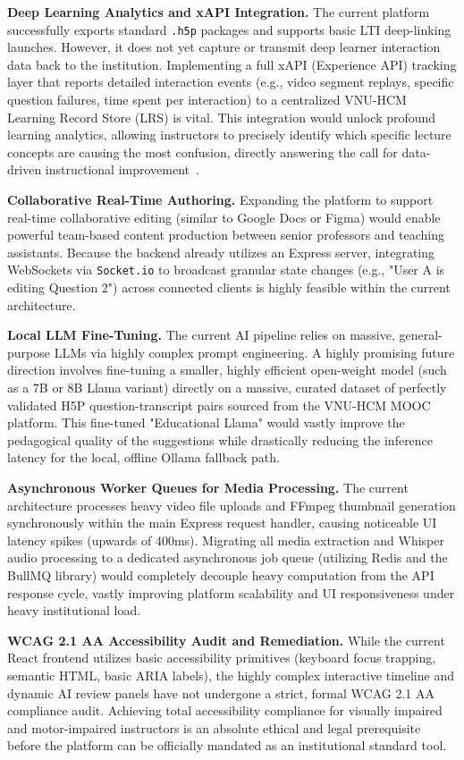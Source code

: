 \textbf{Deep Learning Analytics and xAPI Integration.} The current platform successfully exports standard \texttt{.h5p} packages and supports basic LTI deep-linking launches. However, it does not yet capture or transmit deep learner interaction data back to the institution. Implementing a full xAPI (Experience API) tracking layer that reports detailed interaction events (e.g., video segment replays, specific question failures, time spent per interaction) to a centralized VNU-HCM Learning Record Store (LRS) is vital. This integration would unlock profound learning analytics, allowing instructors to precisely identify which specific lecture concepts are causing the most confusion, directly answering the call for data-driven instructional improvement~\cite{siemens2011}.

\textbf{Collaborative Real-Time Authoring.} Expanding the platform to support real-time collaborative editing (similar to Google Docs or Figma) would enable powerful team-based content production between senior professors and teaching assistants. Because the backend already utilizes an Express server, integrating WebSockets via \texttt{Socket.io} to broadcast granular state changes (e.g., "User A is editing Question 2") across connected clients is highly feasible within the current architecture.

\textbf{Local LLM Fine-Tuning.} The current AI pipeline relies on massive, general-purpose LLMs via highly complex prompt engineering. A highly promising future direction involves fine-tuning a smaller, highly efficient open-weight model (such as a 7B or 8B Llama variant) directly on a massive, curated dataset of perfectly validated H5P question-transcript pairs sourced from the VNU-HCM MOOC platform. This fine-tuned "Educational Llama" would vastly improve the pedagogical quality of the suggestions while drastically reducing the inference latency for the local, offline Ollama fallback path.

\textbf{Asynchronous Worker Queues for Media Processing.} The current architecture processes heavy video file uploads and FFmpeg thumbnail generation synchronously within the main Express request handler, causing noticeable UI latency spikes (upwards of 400ms). Migrating all media extraction and Whisper audio processing to a dedicated asynchronous job queue (utilizing Redis and the BullMQ library) would completely decouple heavy computation from the API response cycle, vastly improving platform scalability and UI responsiveness under heavy institutional load.

\textbf{WCAG 2.1 AA Accessibility Audit and Remediation.} While the current React frontend utilizes basic accessibility primitives (keyboard focus trapping, semantic HTML, basic ARIA labels), the highly complex interactive timeline and dynamic AI review panels have not undergone a strict, formal WCAG 2.1 AA compliance audit. Achieving total accessibility compliance for visually impaired and motor-impaired instructors is an absolute ethical and legal prerequisite before the platform can be officially mandated as an institutional standard tool.